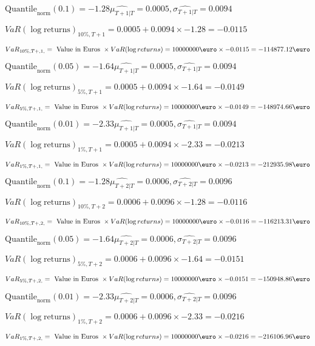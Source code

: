 $\text{Quantile}_\text{norm}(0.1) = -1.28$$\hat{\mu_{T+1|T}} = 0.0005, \hat{\sigma_{T+1|T}} = 0.0094$

$VaR(\log \text{returns})_{10\%, T + 1} = 0.0005 + 0.0094\times-1.28 = -0.0115$

$VaR_{10\%, T + ,1,} = \text{ Value in Euros } \times VaR(\log returns) = 10 000 000 \text{\euro} \times-0.0115 = -114877.12 \text{\euro}$


$\text{Quantile}_\text{norm}(0.05) = -1.64$$\hat{\mu_{T+1|T}} = 0.0005, \hat{\sigma_{T+1|T}} = 0.0094$

$VaR(\log \text{returns})_{5\%, T + 1} = 0.0005 + 0.0094\times-1.64 = -0.0149$

$VaR_{5\%, T + ,1,} = \text{ Value in Euros } \times VaR(\log returns) = 10 000 000 \text{\euro} \times-0.0149 = -148974.66 \text{\euro}$


$\text{Quantile}_\text{norm}(0.01) = -2.33$$\hat{\mu_{T+1|T}} = 0.0005, \hat{\sigma_{T+1|T}} = 0.0094$

$VaR(\log \text{returns})_{1\%, T + 1} = 0.0005 + 0.0094\times-2.33 = -0.0213$

$VaR_{1\%, T + ,1,} = \text{ Value in Euros } \times VaR(\log returns) = 10 000 000 \text{\euro} \times-0.0213 = -212935.98 \text{\euro}$


$\text{Quantile}_\text{norm}(0.1) = -1.28$$\hat{\mu_{T+2|T}} = 0.0006, \hat{\sigma_{T+2|T}} = 0.0096$

$VaR(\log \text{returns})_{10\%, T + 2} = 0.0006 + 0.0096\times-1.28 = -0.0116$

$VaR_{10\%, T + ,2,} = \text{ Value in Euros } \times VaR(\log returns) = 10 000 000 \text{\euro} \times-0.0116 = -116213.31 \text{\euro}$


$\text{Quantile}_\text{norm}(0.05) = -1.64$$\hat{\mu_{T+2|T}} = 0.0006, \hat{\sigma_{T+2|T}} = 0.0096$

$VaR(\log \text{returns})_{5\%, T + 2} = 0.0006 + 0.0096\times-1.64 = -0.0151$

$VaR_{5\%, T + ,2,} = \text{ Value in Euros } \times VaR(\log returns) = 10 000 000 \text{\euro} \times-0.0151 = -150948.86 \text{\euro}$


$\text{Quantile}_\text{norm}(0.01) = -2.33$$\hat{\mu_{T+2|T}} = 0.0006, \hat{\sigma_{T+2|T}} = 0.0096$

$VaR(\log \text{returns})_{1\%, T + 2} = 0.0006 + 0.0096\times-2.33 = -0.0216$

$VaR_{1\%, T + ,2,} = \text{ Value in Euros } \times VaR(\log returns) = 10 000 000 \text{\euro} \times-0.0216 = -216106.96 \text{\euro}$


